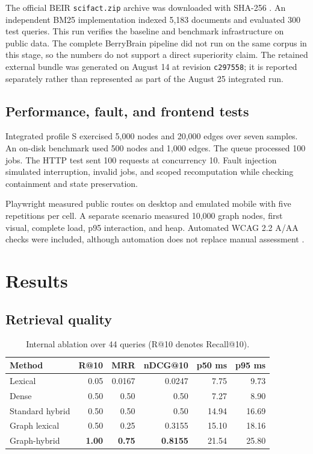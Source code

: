 \documentclass{sbc2023}
\newcommand{\code}[1]{\texttt{#1}}
\begin{document}
The official BEIR \code{scifact.zip} archive was downloaded with SHA-256
\texttt{}.
An independent BM25 implementation indexed 5,183 documents and evaluated 300 test queries. This
run verifies the baseline and benchmark infrastructure on public data. The complete BerryBrain
pipeline did not run on the same corpus in this stage, so the numbers do not support a direct
superiority claim. The retained external bundle was generated on August 14 at revision
\code{c297558}; it is reported separately rather than represented as part of the August 25
integrated run.

\subsection{Performance, fault, and frontend tests}

Integrated profile S exercised 5,000 nodes and 20,000 edges over seven samples. An on-disk
benchmark used 500 nodes and 1,000 edges. The queue processed 100 jobs. The HTTP test sent 100
requests at concurrency 10. Fault injection simulated interruption, invalid jobs, and scoped
recomputation while checking containment and state preservation.

Playwright measured public routes on desktop and emulated mobile with five repetitions per cell.
A separate scenario measured 10,000 graph nodes, first visual, complete load, p95 interaction, and
heap. Automated WCAG 2.2 A/AA checks were included, although automation does not replace manual
assessment \cite{wcag22}.

\section{Results}
\label{sec:results}

\subsection{Retrieval quality}

\begin{table}[!htbp]
\caption{Internal ablation over 44 queries (R@10 denotes Recall@10).}
\label{tab:ablation}
\centering
\scriptsize
\setlength{\tabcolsep}{2.5pt}
\begin{tabularx}{\columnwidth}{Yrrrrr}
\toprule
Method & R@10 & MRR & nDCG@10 & p50 ms & p95 ms \\
\midrule
Lexical & 0.05 & 0.0167 & 0.0247 & 7.75 & 9.73 \\
Dense & 0.50 & 0.50 & 0.50 & 7.27 & 8.90 \\
Standard hybrid & 0.50 & 0.50 & 0.50 & 14.94 & 16.69 \\
Graph lexical & 0.50 & 0.25 & 0.3155 & 15.10 & 18.16 \\
Graph-hybrid & \textbf{1.00} & \textbf{0.75} & \textbf{0.8155} & 21.54 & 25.80 \\
\bottomrule
\end{tabularx}
\end{table}
\end{document}
